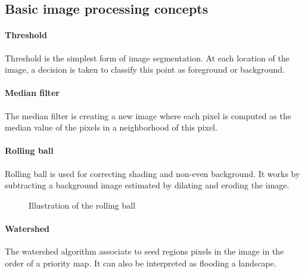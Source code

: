\subsection{Basic image processing concepts}

\paragraph{Threshold} Threshold is the simplest form of image segmentation. At each location of the image, a decision is taken to classify this point as foreground or background. 

\paragraph{Median filter} The median filter is creating a new image where each pixel is computed as the median value of the pixels in a neighborhood of this pixel.

\paragraph{Rolling ball} Rolling ball is used for correcting shading and non-even background. It works by subtracting a background image estimated by dilating and eroding the image.

\begin{figure}\centering
    \caption{Illustration of the rolling ball}
\end{figure}

\paragraph{Watershed} The watershed algorithm associate to seed regions pixels in the image in the order of a priority map. It can also be interpreted as flooding a landscape.

